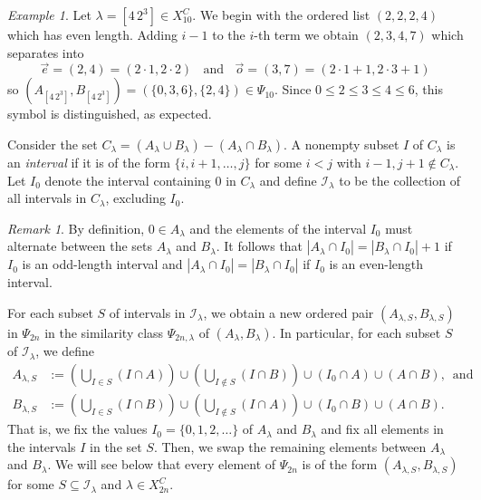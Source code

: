 \documentclass[reqno,11pt]{amsart}
\theoremstyle{remark}
\newtheorem{Rem}[Thm]{Remark}
\theoremstyle{remark}
\newtheorem{example}[Thm]{Example}
\theoremstyle{definition}
\theoremstyle{definition}
\theoremstyle{definition}
\numberwithin{equation}{section}
\newcommand{\ci}{\mathcal{I}}
\begin{document}
\begin{example}\label{ex.dist} Let $\lambda=[4\,2^3]\in X_{10}^C$. We begin with the ordered list $(2,2,2,4)$ which has even length. Adding $i-1$ to the $i$-th term we obtain $(2,3,4,7)$ which separates into
\[
\vec{e} = (2,4) = (2\cdot 1, 2\cdot 2) \;\; \text{ and } \;\; \vec{o} = (3,7)=(2\cdot 1 +1, 2\cdot 3+1)
\]
so $(A_{[4\,2^3]}, B_{[4\,2^3]}) = (\{0,3,6\},\{2,4\}) \in \Psi_{10}$. Since $0\leq 2\leq 3\leq 4\leq 6$, this symbol is distinguished, as expected.
\end{example}

Consider the set $C_\lambda = (A_\lambda \cup B_\lambda)-(A_\lambda \cap B_\lambda)$.  A nonempty subset $I$ of $C_\lambda$ is an \emph{interval} if it is of the form $\{i,i+1,\dots, j\}$ for some $i<j$ with $i-1, j+1\notin C_\lambda$. Let $I_0$ denote the interval containing $0$ in $C_\lambda$ and define $\mathcal I_\lambda$ to be the collection of all intervals in $C_\lambda$, excluding $I_0$.  

\begin{Rem}\label{rem.zero.interval} By definition, $0\in A_\lambda$ and the elements of the interval $I_0$ must alternate between the sets $A_\lambda$ and $B_\lambda$.  It follows that $|A_\lambda \cap I_0| = |B_\lambda\cap I_0|+1$ if $I_0$ is an odd-length interval and $|A_\lambda \cap I_0| = |B_\lambda\cap I_0|$ if $I_0$ is an even-length interval. 
\end{Rem}

For each subset $S$ of intervals in  $\mathcal{I}_\lambda$, we obtain a new ordered pair $(A_{\lambda, S}, B_{\lambda, S})$ in $\Psi_{2n}$ in the similarity class $\Psi_{2n, \lambda}$ of $(A_\lambda, B_\lambda)$.   In particular, for each subset $S$ of $\ci_\lambda$, we define
\begin{align}
\label{eqn.int.bijection.def}
A_{\lambda,S} &:= \left(\bigcup_{I\in S}(I\cap A)\right)\cup\left(\bigcup_{I\notin S} (I\cap B)\right)\cup(I_0\cap A)\cup(A\cap B),\, \text{ and }\\
\nonumber B_{\lambda,S} &:= \left(\bigcup_{I\in S}(I\cap B)\right)\cup\left(\bigcup_{I\notin S} (I\cap A)\right)\cup(I_0\cap B)\cup(A\cap B).
\end{align}
That is, we fix the values $I_0=\{0,1,2,\dots\}$ of $A_\lambda$ and $B_\lambda$ and fix all elements in the intervals $I$ in the set $S$.  Then, we swap the remaining elements between $A_\lambda$ and $B_\lambda$.  We will see below that every element of $\Psi_{2n}$ is of the form $(A_{\lambda, S}, B_{\lambda, S})$ for some $S\subseteq \mathcal{I}_\lambda$ and $\lambda\in X_{2n}^C$.
\end{document}
